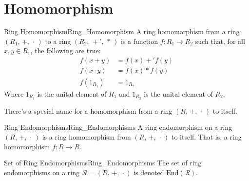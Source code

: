 \section{Homomorphism}
    \begin{fdefinition}{Ring Homomorphism}{Ring_Homomorphism}
        A \gls{ring homomorphism} from a \gls{ring}
        $(R_{1},\,+,\,\cdot\,)$ to a ring $(R_{2},\,+',\,*\,)$ is a
        \gls{function} $f:R_{1}\rightarrow{R}_{2}$ such that, for all
        $x,y\in{R}_{1}$, the following are true:
        \begin{align}
            f(x+y)&=f(x)+'f(y)
            \tag{Preservation of Addition}\\
            f(x\cdot{y})&=f(x)*f(y)
            \tag{Preservation of Multiplication}\\
            f(1_{R_{1}})&=1_{R_{2}}
            \tag{Preservation of Identities}
        \end{align}
        Where $1_{R_{1}}$ is the unital element of $R_{1}$ and
        $1_{R_{2}}$ is the unital element of $R_{2}$.
    \end{fdefinition}
    There's a special name for a homomorphism from a ring $(R,\,+,\,\cdot\,)$
    to itself.
    \begin{fdefinition}{Ring Endomorphisms}{Ring_Endomorphisms}
        A \gls{ring endomorphism} on a \gls{ring}
        $(R,\,+,\,\cdot\,)$ is a \gls{ring homomorphism} from
        $(R,\,+,\,\cdot\,)$ to itself. That is, a ring homomorphism
        $f:R\rightarrow{R}$.
    \end{fdefinition}
    \begin{fnotation}{Set of Ring Endomorphisms}{Ring_Endomorphisms}
        The set of ring endomorphisms on a ring $\mathcal{R}=(R,\,+,\,\cdot)$
        is denoted $\textrm{End}(\mathcal{R})$.
    \end{fnotation}